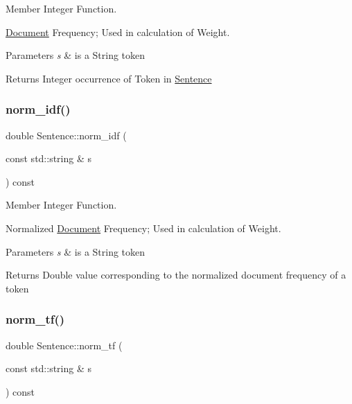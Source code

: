 Member Integer Function. 

\hyperlink{class_document}{Document} Frequency; Used in calculation of Weight.


\begin{DoxyParams}{Parameters}
{\em s} & is a String token \\
\hline
\end{DoxyParams}
\begin{DoxyReturn}{Returns}
Integer occurrence of Token in \hyperlink{class_sentence}{Sentence} 
\end{DoxyReturn}
\mbox{\label{class_sentence_ac114a37a1f4c317f5141802d2d77b209}} 
\subsubsection{\texorpdfstring{norm\+\_\+idf()}{norm\_idf()}}
{\footnotesize\ttfamily double Sentence\+::norm\+\_\+idf (\begin{DoxyParamCaption}\item[{const std\+::string \&}]{s }\end{DoxyParamCaption}) const\hspace{0.3cm}{\ttfamily [private]}}



Member Integer Function. 

Normalized \hyperlink{class_document}{Document} Frequency; Used in calculation of Weight.


\begin{DoxyParams}{Parameters}
{\em s} & is a String token \\
\hline
\end{DoxyParams}
\begin{DoxyReturn}{Returns}
Double value corresponding to the normalized document frequency of a token 
\end{DoxyReturn}
\mbox{\label{class_sentence_a28fab0061fe288f5ed66bdedf05eb82e}} 
\subsubsection{\texorpdfstring{norm\+\_\+tf()}{norm\_tf()}}
{\footnotesize\ttfamily double Sentence\+::norm\+\_\+tf (\begin{DoxyParamCaption}\item[{const std\+::string \&}]{s }\end{DoxyParamCaption}) const\hspace{0.3cm}{\ttfamily [private]}}



